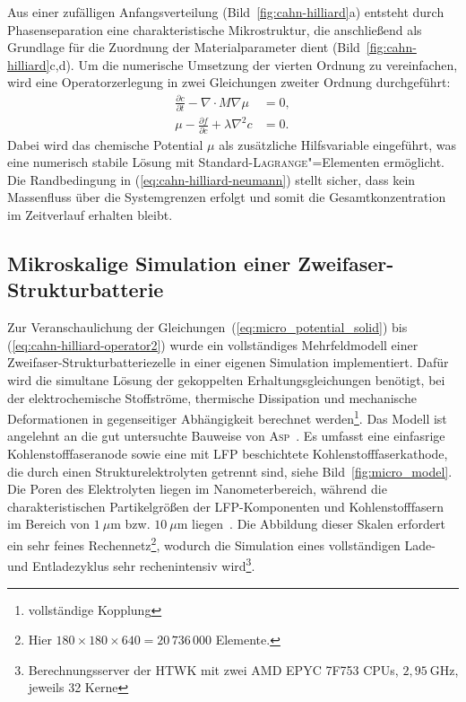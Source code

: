 Aus einer zufälligen Anfangsverteilung (Bild~\ref{fig:cahn-hilliard}a) entsteht durch Phasenseparation eine charakteristische Mikrostruktur, die anschließend als Grundlage für die Zuordnung der Materialparameter dient (Bild~\ref{fig:cahn-hilliard}c,d). Um die numerische Umsetzung der vierten Ordnung zu vereinfachen, wird eine Operatorzerlegung in zwei Gleichungen zweiter Ordnung durchgeführt:
\begin{align}
    \label{eq:cahn-hilliard-operator1}
    \frac{\partial c}{\partial t} - \nabla \cdot M \nabla \mu &= 0,\\
    \label{eq:cahn-hilliard-operator2}
    \mu - \frac{\partial f}{\partial c} + \lambda \nabla^2 c &= 0.
\end{align}
Dabei wird das chemische Potential $\mu$ als zusätzliche Hilfsvariable eingeführt, was eine numerisch stabile Lösung mit Standard-\textsc{Lagrange}"=Elementen ermöglicht. Die Randbedingung in (\ref{eq:cahn-hilliard-neumann}) stellt sicher, dass kein Massenfluss über die Systemgrenzen erfolgt und somit die Gesamtkonzentration im Zeitverlauf erhalten bleibt.

\subsection{Mikroskalige Simulation einer Zweifaser-Strukturbatterie}

Zur Veranschaulichung der Gleichungen~(\ref{eq:micro_potential_solid}) bis (\ref{eq:cahn-hilliard-operator2}) wurde ein vollständiges Mehrfeldmodell einer Zweifaser-Strukturbatteriezelle in einer eigenen Simulation implementiert. Dafür wird die simultane Lösung der gekoppelten Erhaltungsgleichungen benötigt, bei der elektrochemische Stoffströme, thermische Dissipation und mechanische Deformationen in gegenseitiger Abhängigkeit berechnet werden\footnote{vollständige Kopplung}. Das Modell ist angelehnt an die gut untersuchte Bauweise von \textsc{Asp}~\cite{Asp2021,Siraj2023,Carlstedt2022a}. Es umfasst eine einfasrige Kohlenstofffaseranode sowie eine mit LFP beschichtete Kohlenstofffaserkathode, die durch einen Strukturelektrolyten getrennt sind, siehe Bild~\ref{fig:micro_model}. Die Poren des Elektrolyten liegen im Nanometerbereich, während die charakteristischen Partikelgrößen der LFP-Komponenten und Kohlenstofffasern im Bereich von $1~\mu\text{m}$ bzw. $10~\mu\text{m}$ liegen~\cite{Chaudhary2024a,Huson2014}. Die Abbildung dieser Skalen erfordert ein sehr feines Rechennetz\footnote{Hier $180 \times 180 \times 640 = 20\,736\,000$ Elemente.}, wodurch die Simulation eines vollständigen Lade- und Entladezyklus sehr rechenintensiv wird\footnote{Berechnungsserver der HTWK mit zwei AMD EPYC 7F753 CPUs, $2{,}95~\text{GHz}$, jeweils 32 Kerne}.

